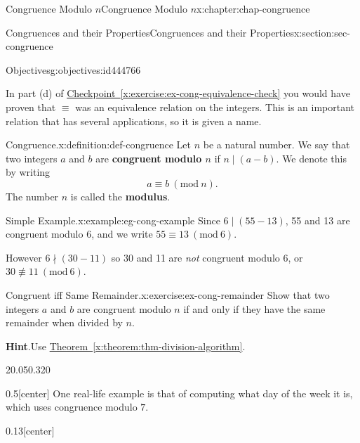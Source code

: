 \documentclass[oneside,10pt,]{book}
\newcommand{\blocktitlefont}{\relax}
\newcommand{\xreffont}{\relax}
\newcommand{\terminology}[1]{\textbf{#1}}
\numberwithin{equation}{section}
\newcommand{\Mod}[1]{\ \left(\mathrm{mod}\ #1\right)}
\begin{document}
\begin{chapterptx}{Congruence Modulo \(n\)}{}{Congruence Modulo \(n\)}{}{}{x:chapter:chap-congruence}
\begin{sectionptx}{Congruences and their Properties}{}{Congruences and their Properties}{}{}{x:section:sec-congruence}
\begin{objectives}{Objectives}{g:objectives:id444766}
\end{objectives}
In part (d) of \hyperref[x:exercise:ex-cong-equivalence-check]{Checkpoint~{\xreffont\ref{x:exercise:ex-cong-equivalence-check}}} you would have proven that \(\equiv\) was an equivalence relation on the integers. This is an important relation that has several applications, so it is given a name.%
\begin{definition}{Congruence.}{x:definition:def-congruence}%
Let \(n\) be a natural number. We say that two integers \(a\) and \(b\) are \terminology{congruent modulo \(n\)} if \(n \mid (a-b)\). We denote this by writing%
\begin{equation*}
a \equiv b \Mod{n}\text{.}
\end{equation*}
The number \(n\) is called the \terminology{modulus}. \label{g:notation:id444838}%
\end{definition}
\begin{example}{Simple Example.}{x:example:eg-cong-example}%
Since \(6 \mid (55-13)\), 55 and 13 are congruent modulo 6, and we write \(55 \equiv 13 \Mod{6}\).%
\par
However \(6 \nmid (30-11)\) so 30 and 11 are \emph{not} congruent modulo 6, or \(30 \not\equiv 11 \Mod{6}\).%
\end{example}
\begin{inlineexercise}{Congruent iff Same Remainder.}{x:exercise:ex-cong-remainder}%
Show that two integers \(a\) and \(b\) are congruent modulo \(n\) if and only if they have the same remainder when divided by \(n\).%
\par\smallskip%
\noindent\textbf{\blocktitlefont Hint}.\hypertarget{g:hint:id444904}{}\quad{}Use \hyperref[x:theorem:thm-division-algorithm]{Theorem~{\xreffont\ref{x:theorem:thm-division-algorithm}}}.%
\end{inlineexercise}
\begin{sidebyside}{2}{0.05}{0.32}{0}%
\begin{sbspanel}{0.5}[center]%
One real-life example is that of computing what day of the week it is, which uses congruence modulo \(7\).%
\end{sbspanel}%
\begin{sbspanel}{0.13}[center]%

\end{sbspanel}
\end{sidebyside}
\end{sectionptx}
\end{chapterptx}
\end{document}
